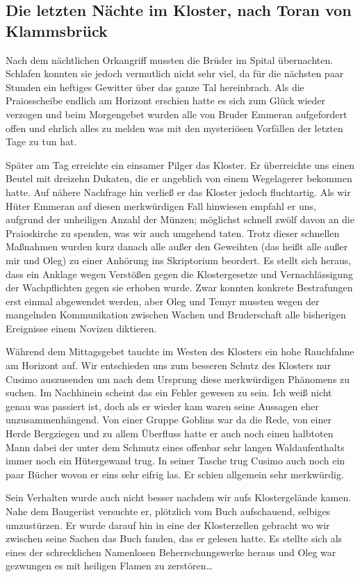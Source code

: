 \subsection{Die letzten Nächte im Kloster, nach Toran von Klammsbrück}

Nach dem nächtlichen Orkangriff mussten die Brüder im Spital übernachten. Schlafen konnten sie jedoch vermutlich nicht sehr viel, da für die nächsten paar Stunden ein heftiges Gewitter über das ganze Tal hereinbrach. Als die Praiosscheibe endlich am Horizont erschien hatte es sich zum Glück wieder verzogen und beim Morgengebet wurden alle von Bruder Emmeran aufgefordert offen und ehrlich alles zu melden was mit den mysteriösen Vorfällen der letzten Tage zu tun hat.

Später am Tag erreichte ein einsamer Pilger das Kloster. Er überreichte uns einen Beutel mit dreizehn Dukaten, die er angeblich von einem Wegelagerer bekommen hatte. Auf nähere Nachfrage hin verließ er das Kloster jedoch fluchtartig. Als wir Hüter Emmeran auf diesen merkwürdigen Fall hinwiesen empfahl er uns, aufgrund der unheiligen Anzahl der Münzen; möglichst schnell zwölf davon an die Praioskirche zu spenden, was wir auch umgehend taten.
Trotz dieser schnellen Maßnahmen wurden kurz danach alle außer den Geweihten (das heißt alle außer mir und Oleg) zu einer Anhörung ins Skriptorium beordert. Es stellt sich heraus, dass ein Anklage wegen Verstößen gegen die Klostergesetze und Vernachlässigung der Wachpflichten gegen sie erhoben wurde. Zwar konnten konkrete Bestrafungen erst einmal abgewendet werden, aber Oleg und Temyr mussten wegen der mangelnden Kommunikation zwischen Wachen und Bruderschaft alle bisherigen Ereignisse einem Novizen diktieren.

Während dem Mittagsgebet tauchte im Westen des Klosters ein hohe Rauchfahne am Horizont auf. Wir entschieden uns zum besseren Schutz des Klosters nur Cusimo auszusenden um nach dem Ursprung diese merkwürdigen Phänomens zu suchen. Im Nachhinein scheint das ein Fehler gewesen zu sein. Ich weiß nicht genau was passiert ist, doch als er wieder kam waren seine Aussagen eher unzusammenhängend. Von einer Gruppe Goblins war da die Rede, von einer Herde Bergziegen und zu allem Überfluss hatte er auch noch einen halbtoten Mann dabei der unter dem Schmutz eines offenbar sehr langen Waldaufenthalts immer noch ein Hütergewand trug. In seiner Tasche trug Cusimo auch noch ein paar Bücher wovon er eins sehr eifrig las. Er schien allgemein sehr merkwürdig.

Sein Verhalten wurde auch nicht besser nachdem wir aufs Klostergelände kamen. Nahe dem Baugerüst versuchte er, plötzlich vom Buch aufschauend, selbiges umzustürzen. Er wurde darauf hin in eine der Klosterzellen gebracht wo wir zwischen seine Sachen das Buch fanden, das er gelesen hatte. Es stellte sich als eines der schrecklichen Namenlosen Beherrschungswerke heraus und Oleg war gezwungen es mit heiligen Flamen zu zerstören\dots 


